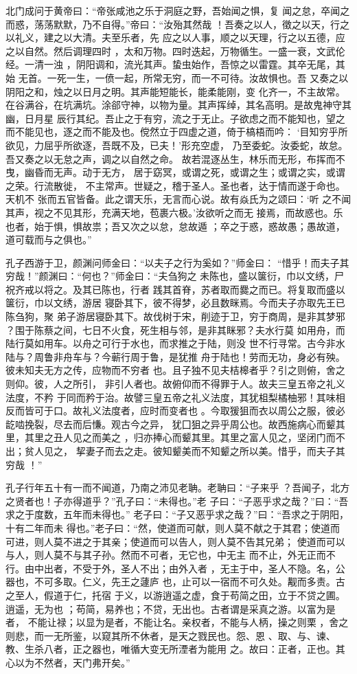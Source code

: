\documentclass[a4paper,12pt,UTF8,twoside]{ctexbook}
\begin{document}
北门成问于黄帝曰：“帝张咸池之乐于洞庭之野，吾始闻之惧，复 闻之怠，卒闻之而惑，荡荡默默，乃不自得。”帝曰：“汝殆其然哉 ！吾奏之以人，徵之以天，行之以礼义，建之以大清。夫至乐者，先 应之以人事，顺之以天理，行之以五德，应之以自然。然后调理四时 ，太和万物。四时迭起，万物循生。一盛一衰，文武伦经。一清一浊 ，阴阳调和，流光其声。蛰虫始作，吾惊之以雷霆。其卒无尾，其始 无首。一死一生，一偾一起，所常无穷，而一不可待。汝故惧也。吾 又奏之以阴阳之和，烛之以日月之明。其声能短能长，能柔能刚，变 化齐一，不主故常。在谷满谷，在坑满坑。涂郤守神，以物为量。其声挥绰，其名高明。是故鬼神守其幽，日月星 辰行其纪。吾止之于有穷，流之于无止。子欲虑之而不能知也，望之 而不能见也，逐之而不能及也。傥然立于四虚之道，倚于槁梧而吟： ‘目知穷乎所欲见，力屈乎所欲逐，吾既不及，已夫！’形充空虚， 乃至委蛇。汝委蛇，故怠。吾又奏之以无怠之声，调之以自然之命。 故若混逐丛生，林乐而无形，布挥而不曳，幽昏而无声。动于无方， 居于窈冥，或谓之死，或谓之生；或谓之实，或谓之荣。行流散徙， 不主常声。世疑之，稽于圣人。圣也者，达于情而遂于命也。天机不 张而五官皆备。此之谓天乐，无言而心说。故有焱氏为之颂曰：‘听 之不闻其声，视之不见其形，充满天地，苞裹六极。’汝欲听之而无 接焉，而故惑也。乐也者，始于惧，惧故祟；吾又次之以怠，怠故遁 ；卒之于惑，惑故愚；愚故道，道可载而与之俱也。”

孔子西游于卫，颜渊问师金曰：“以夫子之行为奚如？”师金曰： “惜乎！而夫子其穷哉！”颜渊曰：“何也？”师金曰：“夫刍狗之 未陈也，盛以箧衍，巾以文绣，尸祝齐戒以将之。及其已陈也，行者 践其首脊，苏者取而爨之而已。将复取而盛以箧衍，巾以文绣，游居 寝卧其下，彼不得梦，必且数眯焉。今而夫子亦取先王已陈刍狗，聚 弟子游居寝卧其下。故伐树于宋，削迹于卫，穷于商周，是非其梦邪 ？围于陈蔡之间，七日不火食，死生相与邻，是非其眯邪？夫水行莫 如用舟，而陆行莫如用车。以舟之可行于水也，而求推之于陆，则没 世不行寻常。古今非水陆与？周鲁非舟车与？今蕲行周于鲁，是犹推 舟于陆也！劳而无功，身必有殃。彼未知夫无方之传，应物而不穷者 也。且子独不见夫桔槔者乎？引之则俯，舍之则仰。彼，人之所引， 非引人者也。故俯仰而不得罪于人。故夫三皇五帝之礼义法度，不矜 于同而矜于治。故譬三皇五帝之礼义法度，其犹柤梨橘柚邪！其味相反而皆可于口。故礼义法度者，应时而变者也 。今取猨狙而衣以周公之服，彼必龁啮挽裂，尽去而后慊。观古今之异， 犹囗狙之异乎周公也。故西施病心而颦其里，其里之丑人见之而美之 ，归亦捧心而颦其里。其里之富人见之，坚闭门而不出；贫人见之， 挈妻子而去之走。彼知颦美而不知颦之所以美。惜乎，而夫子其穷哉 ！”

孔子行年五十有一而不闻道，乃南之沛见老聃。老聃曰：“子来乎 ？吾闻子，北方之贤者也！子亦得道乎？”孔子曰：“未得也。”老 子曰：“子恶乎求之哉？”曰：“吾求之于度数，五年而未得也。” 老子曰：“子又恶乎求之哉？”曰：“吾求之于阴阳，十有二年而未 得也。”老子曰：“然，使道而可献，则人莫不献之于其君；使道而 可进，则人莫不进之于其亲；使道而可以告人，则人莫不告其兄弟； 使道而可以与人，则人莫不与其子孙。然而不可者，无它也，中无主 而不止，外无正而不行。由中出者，不受于外，圣人不出；由外入者 ，无主于中，圣人不隐。名，公器也，不可多取。仁义，先王之蘧庐 也，止可以一宿而不可久处。觏而多责。古之至人，假道于仁，托宿 于义，以游逍遥之虚，食于苟简之田，立于不贷之圃。逍遥，无为也 ；苟简，易养也；不贷，无出也。古者谓是采真之游。以富为是者， 不能让禄；以显为是者，不能让名。亲权者，不能与人柄，操之则栗 ，舍之则悲，而一无所鉴，以窥其所不休者，是天之戮民也。怨、恩 、取、与、谏、教、生杀八者，正之器也，唯循大变无所湮者为能用 之。故曰：正者，正也。其心以为不然者，天门弗开矣。”
\end{document}

